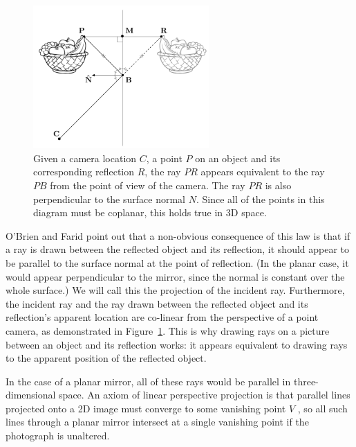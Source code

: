 \documentclass{thesis}
\begin{document}
\begin{figure}
	\centering
    	\includegraphics[width=0.6\textwidth]{normal-reflection}
	\caption{Given a camera location $C$, a point $P$ on an object and its corresponding reflection $R$, the ray $PR$ appears equivalent to the ray $PB$ from the point of view of the camera. The ray $PR$ is also perpendicular to the surface normal $N$. Since all of the points in this diagram must be coplanar, this holds true in 3D space. \cite[Fig.~2]{obrien12}}
	\label{normal-reflection}
\end{figure}

O'Brien and Farid point out that a non-obvious consequence of this law is that if a ray is drawn between the reflected object and its reflection, it should appear to be parallel to the surface normal at the point of reflection. (In the planar case, it would appear perpendicular to the mirror, since the normal is constant over the whole surface.) We will call this the projection of the incident ray. Furthermore, the incident ray and the ray drawn between the reflected object and its reflection's apparent location are co-linear from the perspective of a point camera, as demonstrated in Figure~\ref{normal-reflection}. This is why drawing rays on a picture between an object and its reflection works: it appears equivalent to drawing rays to the apparent position of the reflected object.

In the case of a planar mirror, all of these rays would be parallel in three-dimensional space.\nocite{obrien12} An axiom of linear perspective projection is that parallel lines projected onto a 2D image must converge to some vanishing point $V$ \cite[p.~2]{hartley}, so all such lines through a planar mirror intersect at a single vanishing point if the photograph is unaltered.
\end{document}
